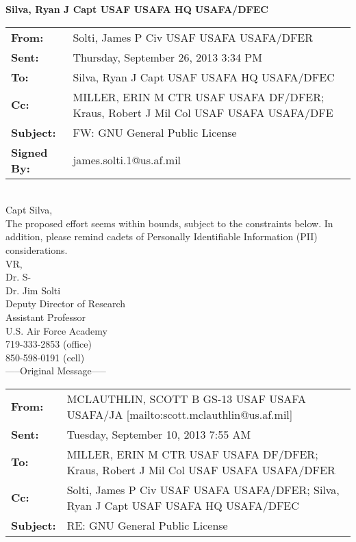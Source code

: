 \documentclass[10pt]{article}
\begin{document}
\noindent\textbf{\large{Silva, Ryan J Capt USAF USAFA HQ USAFA/DFEC}}

\noindent\makebox[\linewidth]{\rule[5mm]{\linewidth}{3.5pt}}

\noindent \begin{tabu} to \textwidth{l X[l]}

    \textbf{From:} & Solti, James P Civ USAF USAFA USAFA/DFER\\ 
    \textbf{Sent:} & Thursday, September 26, 2013 3:34 PM \\
    \textbf{To:} &  Silva, Ryan J Capt USAF USAFA HQ USAFA/DFEC \\
    \textbf{Cc:} & MILLER, ERIN M CTR USAF USAFA DF/DFER; Kraus, Robert J Mil Col USAF USAFA USAFA/DFE \\
    \textbf{Subject:} & FW: GNU General Public License \\
    \textbf{Signed By:} & james.solti.1@us.af.mil \\
\end{tabu}
\hspace{0pt} \\

Capt Silva, \\

The proposed effort seems within bounds, subject to the constraints below.
In addition, please remind cadets of Personally Identifiable Information
(PII) considerations. \\

VR, \\

Dr. S- \\

\noindent Dr. Jim Solti \\
Deputy Director of Research \\
Assistant Professor \\
U.S. Air Force Academy \\
719-333-2853 (office) \\
850-598-0191 (cell) \\


\noindent-----Original Message----- \\

\noindent \begin{tabu} to \textwidth{l X[l]}

    \textbf{From:} & MCLAUTHLIN, SCOTT B GS-13 USAF USAFA USAFA/JA [mailto:scott.mclauthlin@us.af.mil]\\ 
    \textbf{Sent:} & Tuesday, September 10, 2013 7:55 AM \\
    \textbf{To:} & MILLER, ERIN M CTR USAF USAFA DF/DFER; Kraus, Robert J Mil Col USAF USAFA USAFA/DFER \\
    \textbf{Cc:} & Solti, James P Civ USAF USAFA USAFA/DFER; Silva, Ryan J Capt USAF USAFA HQ USAFA/DFEC \\
    \textbf{Subject:} & RE: GNU General Public License \\
\end{tabu}
\hspace{0pt} \\
\end{document}
